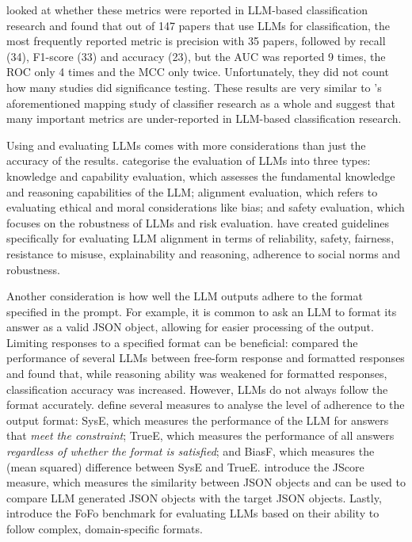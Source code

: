 \documentclass[a4paper]{article}
\begin{document}
\textcite{hou2024} looked at whether these metrics were reported in LLM-based classification research and found that out of 147 papers that use LLMs for classification, the most frequently reported metric is precision with 35 papers, followed by recall (34), F1-score (33) and accuracy (23), but the AUC was reported 9 times, the ROC only 4 times and the MCC only twice. Unfortunately, they did not count how many studies did significance testing. These results are very similar to \textcite{Dellanna2022}'s aforementioned mapping study of classifier research as a whole and suggest that many important metrics are under-reported in LLM-based classification research. 

Using and evaluating LLMs comes with more considerations than just the accuracy of the results. \textcite{guo2023survey} categorise the evaluation of LLMs into three types: knowledge and capability evaluation, which assesses the fundamental knowledge and reasoning capabilities of the LLM; alignment evaluation, which refers to evaluating ethical and moral considerations like bias; and safety evaluation, which focuses on the robustness of LLMs and risk evaluation. \textcite{liu2024} have created guidelines specifically for evaluating LLM alignment in terms of reliability, safety, fairness, resistance to misuse, explainability and reasoning, adherence to social norms and robustness. 

Another consideration is how well the LLM outputs adhere to the format specified in the prompt. For example, it is common to ask an LLM to format its answer as a valid JSON object, allowing for easier processing of the output. Limiting responses to a specified format can be beneficial: \textcite{tam2024format} compared the performance of several LLMs between free-form response and formatted responses and found that, while reasoning ability was weakened for formatted responses, classification accuracy was increased. However, LLMs do not always follow the format accurately. \textcite{long2025format} define several measures to analyse the level of adherence to the output format: SysE, which measures the performance of the LLM for answers that \textit{meet the constraint}; TrueE, which measures the performance of all answers \textit{regardless of whether the format is satisfied}; and BiasF, which measures the (mean squared) difference between SysE and TrueE. \textcite{Li2024format} introduce the JScore measure, which measures the similarity between JSON objects and can be used to compare LLM generated JSON objects with the target JSON objects. Lastly, \textcite{xia2024fofo} introduce the FoFo benchmark for evaluating LLMs based on their ability to follow complex, domain-specific formats. 
\end{document}
